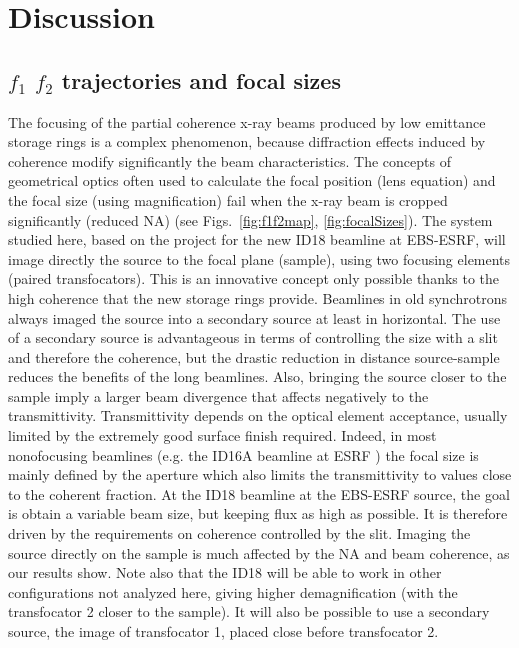 \documentclass{iucr}              %
\begin{document}
\section{Discussion}
\label{sec:discussion}


\subsection{$f_1$ $f_2$ trajectories and focal sizes} 

The focusing of the partial coherence x-ray beams produced by low emittance storage rings is a complex phenomenon, because diffraction effects induced by coherence modify significantly the  beam characteristics. The concepts of geometrical optics often used to calculate the focal position (lens equation) and the focal size (using magnification) fail when the x-ray beam is cropped significantly (reduced NA) (see Figs.~\ref{fig:f1f2map}, \ref{fig:focalSizes}).
The system studied here, based on the project for the new ID18 beamline at EBS-ESRF, will image directly the source to the focal plane (sample), using two focusing elements (paired transfocators). This is an innovative concept only possible thanks to the high coherence that the new storage rings provide. Beamlines in old synchrotrons always imaged the source into a secondary source at least in horizontal. The use of a secondary source is advantageous in terms of controlling the size with a slit and therefore the coherence, but the drastic reduction in distance source-sample reduces the benefits of the long beamlines. Also, bringing the source closer to the sample imply a larger beam divergence that affects negatively to the transmittivity. Transmittivity depends on the optical element acceptance, usually limited by the extremely good surface finish required. Indeed, in most nonofocusing beamlines (e.g. the ID16A beamline at ESRF \cite{ID16A, hierarchical}) the focal size is mainly defined by  the aperture which also limits the transmittivity to values close to the coherent fraction. At the ID18 beamline at the EBS-ESRF source, the goal is obtain a variable beam size, but keeping flux as high as possible. It is therefore driven by the requirements on coherence controlled by the slit. Imaging the source directly on the sample is much affected by the NA and beam coherence, as our results show. Note also that the ID18 will be able to work in other configurations not analyzed here, giving higher demagnification (with the transfocator 2 closer to the sample). It will also be possible to use a secondary source, the image of transfocator 1, placed close before transfocator 2.
\end{document}
